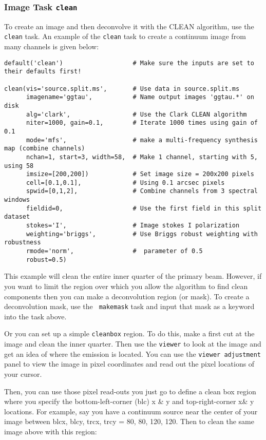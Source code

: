 \subsubsection{Image Task {\tt clean}}

To create an image and then deconvolve it with the CLEAN algorithm,
use the {\tt clean} task.   An example of the {\tt clean} task to
create a continuum image from many channels is given below: 

\small
\begin{verbatim}
default('clean')                   # Make sure the inputs are set to their defaults first!

clean(vis='source.split.ms',       # Use data in source.split.ms
      imagename='ggtau',           # Name output images 'ggtau.*' on disk
      alg='clark',                 # Use the Clark CLEAN algorithm
      niter=1000, gain=0.1,        # Iterate 1000 times using gain of 0.1
      mode='mfs',                  # make a multi-frequency synthesis map (combine channels)
      nchan=1, start=3, width=58,  # Make 1 channel, starting with 5, using 58
      imsize=[200,200])            # Set image size = 200x200 pixels
      cell=[0.1,0.1],              # Using 0.1 arcsec pixels
      spwid=[0,1,2],               # Combine channels from 3 spectral windows
      fieldid=0,                   # Use the first field in this split dataset
      stokes='I',                  # Image stokes I polarization
      weighting='briggs',          # Use Briggs robust weighting with robustness
      rmode='norm',                #  parameter of 0.5
      robust=0.5)
\end{verbatim}
\normalsize

This example will clean the entire inner quarter of the primary beam.
However, if you want to limit the region over which you allow the
algorithm to find clean components then you can make a deconvolution
region (or mask).  To create a deconvolution mask, use the {\tt
makemask} task and input that mask as a keyword into the task above.

Or you can set up a simple {\tt cleanbox} region.  To do this, make
a first cut at the image and clean the inner quarter.  Then use the
{\tt viewer} to look at the image and get an idea of where the
emission is located.  You can use the {\tt viewer adjustment} panel to
view the image in pixel coordinates and read out the pixel locations
of your cursor.  

Then, you can use those pixel read-outs you just go to define a clean
box region where you specify the bottom-left-corner (blc) x \& y and
top-right-corner x\& y locations.  For example, say you have a
continuum source near the center of your image between blcx, blcy, trcx,
trcy = 80, 80, 120, 120.  Then to clean the same image above with this
region: 

